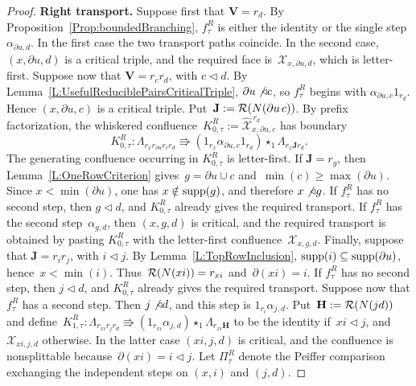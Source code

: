 \documentclass[a4paper, twoside, 11pt, english]{article}
\newcommand{\npath}[1]{\Lambda_{#1}}
\begin{document}
\begin{proof}
\noindent
\textbf{Right transport.}
Suppose first that $\mathbf V=r_d$. By
Proposition~\ref{Prop:boundedBranching}, $f_\tau^R$ is either the identity
or the single step $\alpha_{\partial u,d}$. In the first case the two
transport paths coincide. 
In the second case, $(x,\partial u,d)$ is a critical triple, and the
required face is~$\mathcal X_{x,\partial u,d}$, which is letter-first.
Suppose now that $\mathbf V=r_cr_d$, with $c\triangleleft d$. By
Lemma~\ref{L:UsefulReduciblePairsCriticalTriple},
$\partial u\not\triangleleft c$, so $f_\tau^R$ begins with
$\alpha_{\partial u,c}1_{r_d}$. Hence $(x,\partial u,c)$ is a critical triple.  Put~$\mathbf J:=\mathcal{R}(N(\partial u\,c))$.
By prefix factorization, the whiskered confluence~$K_{0,\tau}^R
:=
\widehat{\mathcal X}^{\,r_d}_{x,\partial u,c}$
has boundary
\[
K_{0,\tau}^R\colon
\npath{r_xr_{\partial u}r_cr_d}
\Rrightarrow
(1_{r_x}\alpha_{\partial u,c}1_{r_d})
\star_1
\npath{r_x\mathbf J r_d}.
\]
The generating confluence occurring in $K_{0,\tau}^R$ is letter-first.
If $\mathbf J=r_g$, then Lemma~\ref{L:OneRowCriterion} gives~$g=\partial u\cup c$ and~$\min(c)\geq\max(\partial u)$.
Since $x<\min(\partial u)$, one has $x\notin\operatorname{supp}(g)$, and therefore
$x\not\triangleleft g$.
If $f_\tau^R$ has no second step, then $g\triangleleft d$, and
$K_{0,\tau}^R$ already gives the required transport. If $f_\tau^R$ has
the second step~$\alpha_{g,d}$, then $(x,g,d)$ is critical, and the
required transport is obtained by pasting $K_{0,\tau}^R$ with the
letter-first confluence~$\mathcal X_{x,g,d}$.
Finally, suppose that $\mathbf J=r_ir_j$, with $i\triangleleft j$. By
Lemma~\ref{L:TopRowInclusion},
$\operatorname{supp}(i)\subseteq\operatorname{supp}(\partial u)$, hence~$x<\min(i)$. Thus~$
\mathcal{R}(N(xi))=r_{xi}$ and~$\partial(xi)=i$.
If $f_\tau^R$ has no second step, then $j\triangleleft d$, and
$K_{0,\tau}^R$ already gives the required transport.
Suppose now that $f_\tau^R$ has a second step. Then
$j\not\triangleleft d$, and this step is
$1_{r_i}\alpha_{j,d}$. Put~$\mathbf H:=\mathcal{R}(N(jd))$
and define~$
K_{1,\tau}^R\colon
\npath{r_{xi}r_jr_d}
\Rrightarrow
(1_{r_{xi}}\alpha_{j,d})\star_1
\npath{r_{xi}\mathbf H}$
to be the identity if~$xi\triangleleft j$, and
$\mathcal X_{xi,j,d}$ otherwise. In the latter case $(xi,j,d)$ is
critical, and the confluence is nonsplittable because~$\partial(xi)=i\triangleleft j$.
Let $\Pi_\tau^R$ denote the Peiffer comparison exchanging the independent
steps on $(x,i)$ and $(j,d)$.


\end{proof}
\end{document}
